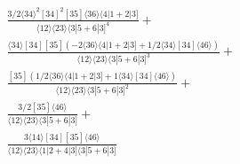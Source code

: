 \documentclass[varwidth, border=5pt]{standalone}
\begin{document}
\begin{my}
$\begin{gathered}
\scriptscriptstyle\frac{3/2⟨34⟩^2[34]^2[35]⟨36⟩⟨4|1+2|3]}{⟨12⟩⟨23⟩⟨3|5+6|3]^4}+\\
\scriptscriptstyle\frac{⟨34⟩[34][35](-2⟨36⟩⟨4|1+2|3]+1/2⟨34⟩[34]⟨46⟩)}{⟨12⟩⟨23⟩⟨3|5+6|3]^3}+\\
\scriptscriptstyle\frac{[35](1/2⟨36⟩⟨4|1+2|3]+1⟨34⟩[34]⟨46⟩)}{⟨12⟩⟨23⟩⟨3|5+6|3]^2}+\\
\scriptscriptstyle\frac{3/2[35]⟨46⟩}{⟨12⟩⟨23⟩⟨3|5+6|3]}+\\
\scriptscriptstyle\frac{3⟨14⟩[34][35]⟨46⟩}{⟨12⟩⟨23⟩⟨1|2+4|3]⟨3|5+6|3]}\phantom{+}
\end{gathered}$
\end{my}
\end{document}
